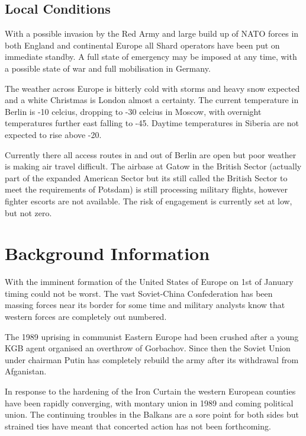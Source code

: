 \documentclass{amsart}
\begin{document}
\begin{multicols}{3}
\begin{enumerate}
\end{enumerate}

\subsection{Local Conditions}
With a possible invasion by the Red Army and large build up of NATO
forces in both England and continental Europe all Shard operators have
been put on immediate standby.  A full state of emergency may be
imposed at any time, with a possible state of war and full
mobilisation in Germany.

The weather across Europe is bitterly cold with storms and heavy snow
expected and a white Christmas is London almost a certainty.  The
current temperature in Berlin is -10\textdegree{} celcius, dropping to
-30\textdegree{} celcius in Moscow, with overnight temperatures
further east falling to -45\textdegree.  Daytime temperatures in
Siberia are not expected to rise above -20\textdegree.

Currently there all access routes in and out of Berlin are open but
poor weather is making air travel difficult.  The airbase at Gatow in
the British Sector (actually part of the expanded American Sector but
its still called the British Sector to meet the requirements of
Potsdam) is still processing military flights, however fighter escorts
are not available.  The risk of engagement is currently set at low,
but not zero.

\section{Background Information}

With the imminent formation of the United States of Europe on 1st of
January timing could not be worst.  The vast Soviet-China
Confederation has been massing forces near its border for some time
and military analysts know that western forces are completely out
numbered.

The 1989 uprising in communist Eastern Europe had been crushed after a
young KGB agent organised an overthrow of Gorbachov.  Since then the
Soviet Union under chairman Putin has completely rebuild the army
after its withdrawal from Afganistan.

In response to the hardening of the Iron Curtain the western European
counties have been rapidly converging, with montary union in 1989 and
coming political union.  The continuing troubles in the Balkans are a
sore point for both sides but strained ties have meant that concerted
action has not been forthcoming.


\end{multicols}
\end{document}
